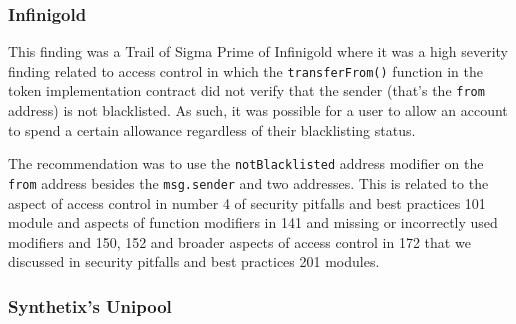 \subsubsection{Infinigold}\label{infinigold}

This finding was a Trail of Sigma Prime of Infinigold where it was a
high severity finding related to access control in which the
\texttt{transferFrom()} function in the token implementation contract
did not verify that the sender (that's the \texttt{from} address) is not
blacklisted. As such, it was possible for a user to allow an account to
spend a certain allowance regardless of their blacklisting status.

The recommendation was to use the \texttt{notBlacklisted} address
modifier on the \texttt{from} address besides the \texttt{msg.sender}
and two addresses. This is related to the aspect of access control in
number 4 of security pitfalls and best practices 101 module and aspects
of function modifiers in 141 and missing or incorrectly used modifiers
and 150, 152 and broader aspects of access control in 172 that we
discussed in security pitfalls and best practices 201 modules.

\subsubsection{Synthetix's Unipool}\label{synthetixs-unipool}

